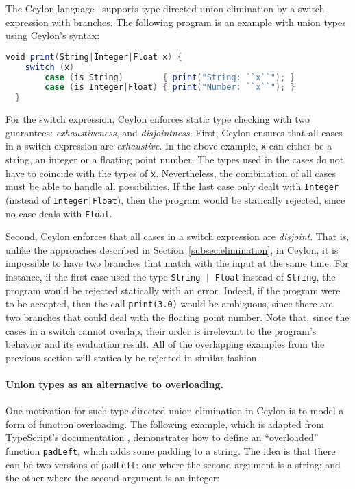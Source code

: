 The Ceylon language~\citep{king2013ceylon} supports type-directed 
union elimination by a switch expression with branches.
The following program is an example
with union types using Ceylon's syntax:

\begin{lstlisting}[language=Scala]
  void print(String|Integer|Float x) {
  	switch (x)
    	case (is String)        { print("String: ``x``"); }
    	case (is Integer|Float) { print("Number: ``x``"); }
  }
\end{lstlisting}
%

For the switch expression, Ceylon enforces static type checking with two
guarantees: \textit{exhaustiveness}, and \textit{disjointness}. First, Ceylon
ensures that all cases in a switch expression are \textit{exhaustive}. In the above
example, \lstinline{x} can either be a string, an integer or a floating point
number. The types used in the cases do not have to coincide with the types
of \lstinline{x}. Nevertheless, the combination of all cases must be able to
handle all possibilities. If the last case only dealt with
\lstinline{Integer} (instead of \lstinline{Integer|Float}), then the program
would be statically rejected, since no case deals with \lstinline{Float}.

Second, Ceylon enforces that all cases in a switch expression are
\textit{disjoint}. That is, unlike the approaches described in
Section~\ref{subsec:elimination}, in Ceylon, it is impossible to have two
branches that match with the input at the same time. For instance, if the first
case used the type \lstinline{String | Float} instead of \lstinline{String}, the
program would be rejected statically with an error. Indeed, if the program
were to be accepted, then the call \lstinline{print(3.0)} would be ambiguous,
since there are two branches that could deal with the floating point number. Note that, since
the cases in a switch cannot overlap, their order is irrelevant to the program's
behavior and its evaluation result.
All of the overlapping examples from the previous section will statically be
rejected in similar fashion.

\paragraph*{Union types as an alternative to overloading.}
One motivation for such type-directed union elimination in Ceylon is to
model a form of function overloading.
The following example, which is adapted from TypeScript's
documentation \citep{typescriptdoc},
demonstrates how to define an ``overloaded'' function \lstinline{padLeft},
which adds some padding to a string. The idea is that there can be two versions
of \lstinline{padLeft}: one where the second argument is a string; and
the other where the second argument is an integer:

